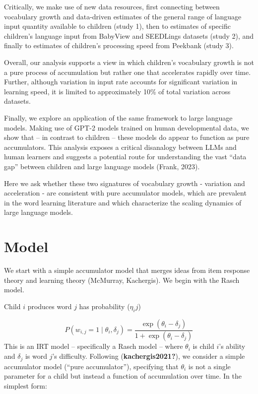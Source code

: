 \documentclass[
]{pnas-new}
\begin{document}
Critically, we make use of new data resources, first connecting between
vocabulary growth and data-driven estimates of the general range of
language input quantity available to children (study 1), then to
estimates of specific children's language input from BabyView and
SEEDLings datasets (study 2), and finally to estimates of children's
processing speed from Peekbank (study 3).

Overall, our analysis supports a view in which children's vocabulary
growth is not a pure process of accumulation but rather one that
accelerates rapidly over time. Further, although variation in input rate
accounts for significant variation in learning speed, it is limited to
approximately 10\% of total variation across datasets.

Finally, we explore an application of the same framework to large
language models. Making use of GPT-2 models trained on human
developmental data, we show that -- in contrast to children -- these
models do appear to function as pure accumulators. This analysis exposes
a critical disanalogy between LLMs and human learners and suggests a
potential route for understanding the vast ``data gap'' between children
and large language models (Frank, 2023).

Here we ask whether these two signatures of vocabulary growth -
variation and acceleration - are consistent with pure accumulator
models, which are prevalent in the word learning literature and which
characterize the scaling dynamics of large language models.

\section{Model}\label{model}

We start with a simple accumulator model that merges ideas from item
response theory and learning theory (McMurray, Kachergis). We begin with
the Rasch model.

Child \(i\) produces word \(j\) has probability (\(\eta_ij\))

\[P(w_{i,j}=1 \mid \theta_i, \delta_j) =\frac{\exp(\theta_i - \delta_j)}{1 + \exp(\theta_i - \delta_j)}\]
This is an IRT model -- specifically a Rasch model -- where \(\theta_i\)
is child \(i\)'s ability and \(\delta_j\) is word \(j\)'s difficulty.
Following (\textbf{kachergis2021?}), we consider a simple accumulator
model (``pure accumulator''), specifying that \(\theta_i\) is not a
single parameter for a child but instead a function of accumulation over
time. In the simplest form:
\end{document}
